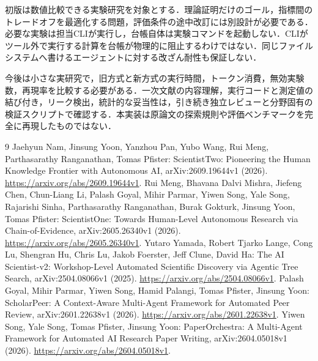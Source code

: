\documentclass[submit,techrep,noauthor]{ipsj}
\begin{document}
初版は数値比較できる実験研究を対象とする．理論証明だけのゴール，指標間のトレードオフを最適化する問題，評価条件の途中改訂には別設計が必要である．必要な実験は担当CLIが実行し，台帳自体は実験コマンドを起動しない．CLIがツール外で実行する計算を台帳が物理的に阻止するわけではない．同じファイルシステムへ書けるエージェントに対する改ざん耐性も保証しない．

今後は小さな実研究で，旧方式と新方式の実行時間，トークン消費，無効実験数，再現率を比較する必要がある．一次文献の内容理解，実行コードと測定値の結び付き，リーク検出，統計的な妥当性は，引き続き独立レビューと分野固有の検証スクリプトで確認する．本実装は原論文の探索規則や評価ベンチマークを完全に再現したものではない．

\clearpage
\begin{thebibliography}{9}
 Jaehyun Nam, Jinsung Yoon, Yanzhou Pan, Yubo Wang, Rui Meng, Parthasarathy Ranganathan, Tomas Pfister: ScientistTwo: Pioneering the Human Knowledge Frontier with Autonomous AI, arXiv:2609.19644v1 (2026). \url{https://arxiv.org/abs/2609.19644v1}.
 Rui Meng, Bhavana Dalvi Mishra, Jiefeng Chen, Chun-Liang Li, Palash Goyal, Mihir Parmar, Yiwen Song, Yale Song, Rajarishi Sinha, Parthasarathy Ranganathan, Burak Gokturk, Jinsung Yoon, Tomas Pfister: ScientistOne: Towards Human-Level Autonomous Research via Chain-of-Evidence, arXiv:2605.26340v1 (2026). \url{https://arxiv.org/abs/2605.26340v1}.
 Yutaro Yamada, Robert Tjarko Lange, Cong Lu, Shengran Hu, Chris Lu, Jakob Foerster, Jeff Clune, David Ha: The AI Scientist-v2: Workshop-Level Automated Scientific Discovery via Agentic Tree Search, arXiv:2504.08066v1 (2025). \url{https://arxiv.org/abs/2504.08066v1}.
 Palash Goyal, Mihir Parmar, Yiwen Song, Hamid Palangi, Tomas Pfister, Jinsung Yoon: ScholarPeer: A Context-Aware Multi-Agent Framework for Automated Peer Review, arXiv:2601.22638v1 (2026). \url{https://arxiv.org/abs/2601.22638v1}.
 Yiwen Song, Yale Song, Tomas Pfister, Jinsung Yoon: PaperOrchestra: A Multi-Agent Framework for Automated AI Research Paper Writing, arXiv:2604.05018v1 (2026). \url{https://arxiv.org/abs/2604.05018v1}.
\end{thebibliography}
\end{document}
